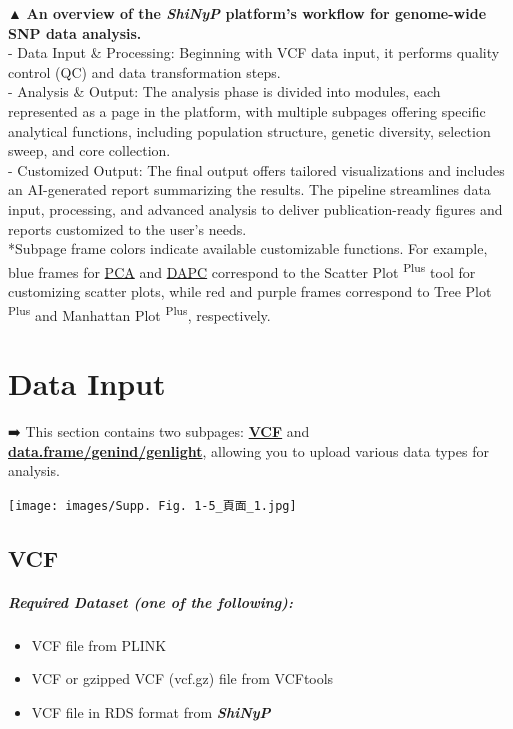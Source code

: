 \documentclass[
]{book}
\begin{document}
▲ \textbf{An overview of the {\emph{ShiNyP}} platform's workflow for genome-wide SNP data analysis.}\\
- Data Input \& Processing: Beginning with VCF data input, it performs quality control (QC) and data transformation steps.\\
- Analysis \& Output: The analysis phase is divided into modules, each represented as a page in the platform, with multiple subpages offering specific analytical functions, including population structure, genetic diversity, selection sweep, and core collection.\\
- Customized Output: The final output offers tailored visualizations and includes an AI-generated report summarizing the results. The pipeline streamlines data input, processing, and advanced analysis to deliver publication-ready figures and reports customized to the user's needs.\\
*Subpage frame colors indicate available customizable functions. For example, blue frames for \ul{PCA} and \ul{DAPC} correspond to the Scatter Plot \textsuperscript{Plus} tool for customizing scatter plots, while red and purple frames correspond to Tree Plot \textsuperscript{Plus} and Manhattan Plot \textsuperscript{Plus}, respectively.

\chapter{Data Input}\label{sec-data-input}

➡️ This section contains two subpages: \ul{\textbf{VCF}} and \ul{\textbf{data.frame/genind/genlight}}, allowing you to upload various data types for analysis.

\texttt{[image: images/Supp. Fig. 1-5\_頁面\_1.jpg]}

\section{VCF}\label{vcf}

\paragraph*{Required Dataset (one of the following):}\label{required-dataset-one-of-the-following}

\begin{itemize}
\item
  VCF file from PLINK
\item
  VCF or gzipped VCF (vcf.gz) file from VCFtools
\item
  VCF file in RDS format from {\textbf{\emph{ShiNyP}}}
\end{itemize}
\end{document}
